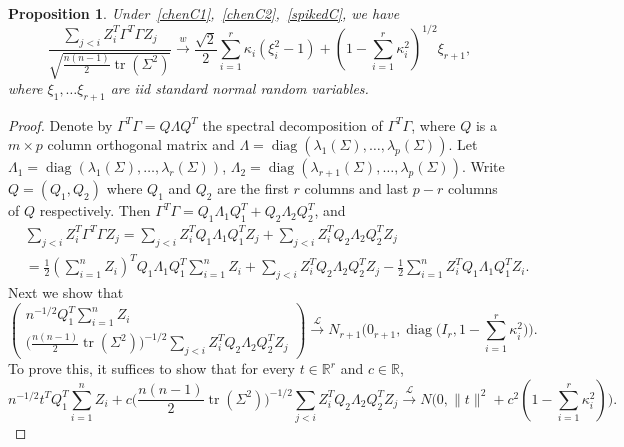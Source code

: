 \documentclass[review]{elsarticle}
\DeclareMathOperator{\mytr}{tr}
\DeclareMathOperator{\mydiag}{diag}
\theoremstyle{plain}
\newtheorem{proposition}{\quad\quad Proposition}
\theoremstyle{definition}
\theoremstyle{remark}
\begin{document}
\begin{proposition}\label{prop:spiked2}
    Under~\eqref{chenC1},~\eqref{chenC2},~\eqref{spikedC},
    we have
    $$
    \frac{\sum_{j<i} Z_i^T \Gamma^T \Gamma Z_j }{\sqrt{\frac{n(n-1)}{2}\mytr(\Sigma^2)}}
    \xrightarrow{w}\frac{\sqrt{2}}{2}\sum_{i=1}^r \kappa_i (\xi_i^2-1)+(1-\sum_{i=1}^r \kappa_i^2)^{1/2} \xi_{r+1},
    $$
    where $\xi_1,\ldots \xi_{r+1}$ are iid standard normal random variables.
\end{proposition}

\begin{proof}
    Denote by $\Gamma^T \Gamma= Q\Lambda Q^T$ the spectral decomposition of $\Gamma^T \Gamma$, where  $Q$ is a $m\times p$ column orthogonal matrix and $\Lambda=\mydiag(\lambda_1(\Sigma),\ldots,\lambda_p(\Sigma))$.
    Let $\Lambda_{1}=\mydiag(\lambda_1(\Sigma),\ldots,\lambda_r(\Sigma))$, $\Lambda_{2}=\mydiag(\lambda_{r+1}(\Sigma),\ldots,\lambda_p(\Sigma))$.
    Write $Q=(Q_{1},Q_{2})$ where $Q_{1}$ and $Q_{2}$ are the first $r$ columns and last $p-r$ columns of $Q$ respectively.
    Then $\Gamma^T \Gamma=Q_1\Lambda_1 Q_1^T + Q_2 \Lambda_2 Q_2^T$, and
    $$
    \begin{aligned}
        &\sum_{j<i}Z_i^T \Gamma^T\Gamma Z_j
        =
    \sum_{j<i}Z_i^T Q_1 \Lambda_1 Q_1^T Z_j+
    \sum_{j<i}Z_i^T Q_2 \Lambda_2 Q_2^T Z_j
    \\
        &=
        \frac{1}{2}(\sum_{i=1}^n  Z_i)^T Q_1\Lambda_1 Q_1^T \sum_{i=1}^n  Z_i +
    \sum_{j<i}Z_i^T Q_2 \Lambda_2 Q_2^T Z_j
        -\frac{1}{2}\sum_{i=1}^n Z_i^T Q_1 \Lambda_1 Q_1^T Z_i
        .
    \end{aligned}
    $$
    Next we show that 
    \begin{equation}\label{eq:toProveCLT}
    \begin{pmatrix}
        n^{-1/2} Q_1^T \sum_{i=1}^n Z_i\\ \big(\frac{n(n-1)}{2} \mytr(\Sigma^2)\big)^{-1/2}\sum_{j<i}Z_i^T Q_2 \Lambda_2 Q_2^T Z_j
    \end{pmatrix}
    \xrightarrow{\mathcal{L}} N_{r+1}\Big(0_{r+1}, \mydiag \big(I_{r},1-\sum_{i=1}^r \kappa_i^2\big)\Big).
\end{equation}
    To prove this, it suffices to show that for every $t\in\mathbb{R}^r$ and $c\in\mathbb{R}$,
    \begin{equation}\label{eq:univariateCLT}
        n^{-1/2} t^T Q_1^T \sum_{i=1}^n Z_i+c\big(\frac{n(n-1)}{2} \mytr(\Sigma^2)\big)^{-1/2}\sum_{j<i}Z_i^T Q_2 \Lambda_2 Q_2^T Z_j
        \xrightarrow{\mathcal{L}}N\big(0,\|t\|^2+c^2(1-\sum_{i=1}^r \kappa_i^2)\big).

\end{equation}
\end{proof}
\end{document}

